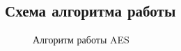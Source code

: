 
\subsection{Схема алгоритма работы}

\begin{figure}[h]
    \centering
    \def\svgwidth{0.8\textwidth}
    
    \caption{Алгоритм работы AES}
\end{figure}

